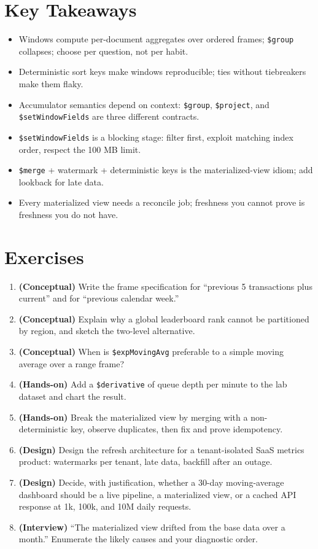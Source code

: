 \section*{Key Takeaways}
\begin{itemize}
    \item Windows compute per-document aggregates over ordered frames; \texttt{\$group} collapses; choose per question, not per habit.
    \item Deterministic sort keys make windows reproducible; ties without tiebreakers make them flaky.
    \item Accumulator semantics depend on context: \texttt{\$group}, \texttt{\$project}, and \texttt{\$setWindowFields} are three different contracts.
    \item \texttt{\$setWindowFields} is a blocking stage: filter first, exploit matching index order, respect the 100 MB limit.
    \item \texttt{\$merge} + watermark + deterministic keys is the materialized-view idiom; add lookback for late data.
    \item Every materialized view needs a reconcile job; freshness you cannot prove is freshness you do not have.
\end{itemize}

\section{Exercises}
\begin{enumerate}
    \item \textbf{(Conceptual)} Write the frame specification for ``previous 5 transactions plus current'' and for ``previous calendar week.''
    \item \textbf{(Conceptual)} Explain why a global leaderboard rank cannot be partitioned by region, and sketch the two-level alternative.
    \item \textbf{(Conceptual)} When is \texttt{\$expMovingAvg} preferable to a simple moving average over a range frame?
    \item \textbf{(Hands-on)} Add a \texttt{\$derivative} of queue depth per minute to the lab dataset and chart the result.
    \item \textbf{(Hands-on)} Break the materialized view by merging with a non-deterministic key, observe duplicates, then fix and prove idempotency.
    \item \textbf{(Design)} Design the refresh architecture for a tenant-isolated SaaS metrics product: watermarks per tenant, late data, backfill after an outage.
    \item \textbf{(Design)} Decide, with justification, whether a 30-day moving-average dashboard should be a live pipeline, a materialized view, or a cached API response at 1k, 100k, and 10M daily requests.
    \item \textbf{(Interview)} ``The materialized view drifted from the base data over a month.'' Enumerate the likely causes and your diagnostic order.
\end{enumerate}


